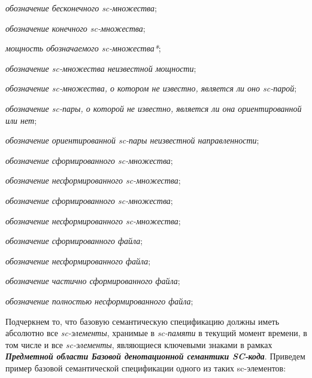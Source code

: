 \begin{textitemize}
	\item \textit{обозначение бесконечного sc-множества};
	\item \textit{обозначение конечного sc-множества};
	\item \textit{мощность обозначаемого sc-множества*};
	\item \textit{обозначение sc-множества неизвестной мощности};
	\item \textit{обозначение sc-множества, о котором не известно, является ли оно sc-парой};
	\item \textit{обозначение sc-пары, о которой не известно, является ли она ориентированной или нет};
	\item \textit{обозначение ориентированной sc-пары неизвестной направленности};
	\item \textit{обозначение сформированного sc-множества};
	\item \textit{обозначение несформированного sc-множества};
	\item \textit{обозначение  сформированного sc-множества};
	\item \textit{обозначение  несформированного sc-множества};
	\item \textit{обозначение сформированного файла};
	\item \textit{обозначение несформированного файла};
	\item \textit{обозначение частично сформированного файла};
	\item \textit{обозначение полностью несформированного файла};
\end{textitemize}

Подчеркнем то, что базовую семантическую спецификацию должны иметь абсолютно все \textit{sc-элементы}, хранимые в \textit{sc-памяти} в текущий момент времени, в том числе и все \textit{sc-элементы}, являющиеся ключевыми знаками в рамках \textbf{\textit{Предметной области Базовой денотационной семантики SC-кода}}. Приведем пример базовой семантической спецификации одного из таких sc-элементов:

